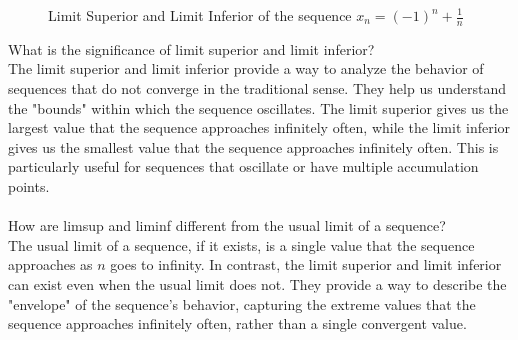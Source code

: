 \documentclass[openany]{book}
\begin{document}
\begin{figure}[H]
    \centering
    \caption{Limit Superior and Limit Inferior of the sequence $x_n = (-1)^n + \frac{1}{n}$}
\end{figure}
\begin{mynote}
    What is the significance of limit superior and limit inferior? \\
    The limit superior and limit inferior provide a way to analyze the behavior of sequences that do not converge in the traditional sense. They help us understand the "bounds" within which the sequence oscillates. The limit superior gives us the largest value that the sequence approaches infinitely often, while the limit inferior gives us the smallest value that the sequence approaches infinitely often. This is particularly useful for sequences that oscillate or have multiple accumulation points. \\ \\
    How are limsup and liminf different from the usual limit of a sequence? \\
    The usual limit of a sequence, if it exists, is a single value that the sequence approaches as $n$ goes to infinity. In contrast, the limit superior and limit inferior can exist even when the usual limit does not. They provide a way to describe the "envelope" of the sequence's behavior, capturing the extreme values that the sequence approaches infinitely often, rather than a single convergent value.
\end{mynote}
\end{document}
